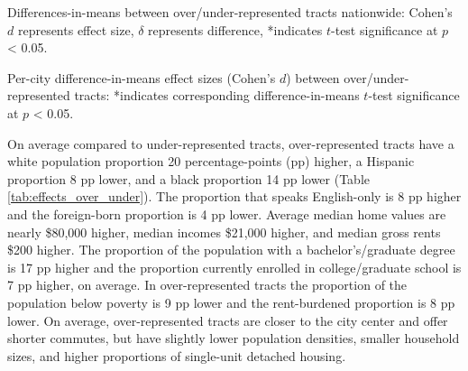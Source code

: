 \documentclass[11pt,letterpaper]{article}
\begin{document}
\begin{table}[tbp]
	\centering
	\small
	\caption{Differences-in-means between over/under-represented tracts nationwide: Cohen's $d$ represents effect size, $\delta$ represents difference, *indicates $t$-test significance at $p$ < 0.05.}
	\label{tab:effects_over_under}
	
\end{table}

\begin{table}[tbp]
	\centering
	\caption{Per-city difference-in-means effect sizes (Cohen's $d$) between over/under-represented tracts: *indicates corresponding difference-in-means $t$-test significance at $p$ < 0.05.}
	\label{tab:effects_cities}
	
\end{table}

On average compared to under-represented tracts, over-represented tracts have a white population proportion 20 percentage-points (pp) higher, a Hispanic proportion 8 pp lower, and a black proportion 14 pp lower (Table \ref{tab:effects_over_under}). The proportion that speaks English-only is 8 pp higher and the foreign-born proportion is 4 pp lower. Average median home values are nearly \$80,000 higher, median incomes \$21,000 higher, and median gross rents \$200 higher. The proportion of the population with a bachelor's/graduate degree is 17 pp higher and the proportion currently enrolled in college/graduate school is 7 pp higher, on average. In over-represented tracts the proportion of the population below poverty is 9 pp lower and the rent-burdened proportion is 8 pp lower. On average, over-represented tracts are closer to the city center and offer shorter commutes, but have slightly lower population densities, smaller household sizes, and higher proportions of single-unit detached housing.
\end{document}
